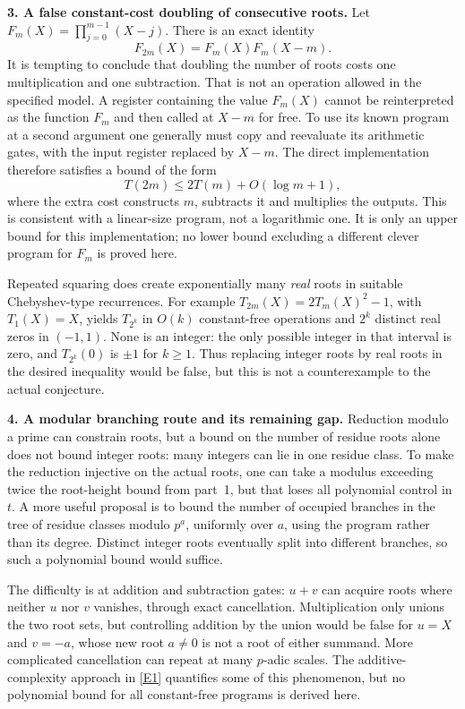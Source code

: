\documentclass[11pt,a4paper]{article}
\newcommand{\eref}[2]{\hyperlink{extra:#1:#2}{[E#2]}}
\numberwithin{equation}{section}
\begin{document}
\textbf{3. A false constant-cost doubling of consecutive roots.}
Let $F_m(X)=\prod_{j=0}^{m-1}(X-j)$. There is an exact identity
\begin{equation}\label{statement:falling}
 F_{2m}(X)=F_m(X)F_m(X-m).
\end{equation}
It is tempting to conclude that doubling the number of roots costs one
multiplication and one subtraction. That is not an operation allowed in
the specified model. A register containing the value $F_m(X)$ cannot be
reinterpreted as the function $F_m$ and then called at $X-m$ for free.
To use its known program at a second argument one generally must copy
and reevaluate its arithmetic gates, with the input register replaced by
$X-m$. The direct implementation therefore satisfies a bound of the form
\[
 T(2m)\le 2T(m)+O(\log m+1),
\]
where the extra cost constructs $m$, subtracts it and multiplies the
outputs. This is consistent with a linear-size program, not a logarithmic
one. It is only an upper bound for this implementation; no lower bound
excluding a different clever program for $F_m$ is proved here.

Repeated squaring does create exponentially many \emph{real} roots in
suitable Chebyshev-type recurrences. For example
$T_{2m}(X)=2T_m(X)^2-1$, with $T_1(X)=X$, yields $T_{2^k}$ in $O(k)$
constant-free operations and $2^k$ distinct real zeros in $(-1,1)$.
None is an integer: the only possible integer in that interval is zero,
and $T_{2^k}(0)$ is $\pm1$ for $k\ge1$. Thus replacing integer roots by
real roots in the desired inequality would be false, but this is not a
counterexample to the actual conjecture.

\textbf{4. A modular branching route and its remaining gap.}
Reduction modulo a prime can constrain roots, but a bound on the number
of residue roots alone does not bound integer roots: many integers can
lie in one residue class. To make the reduction injective on the actual
roots, one can take a modulus exceeding twice the root-height bound from
part~1, but that loses all polynomial control in $t$.
A more useful proposal is to bound the number of occupied branches in
the tree of residue classes modulo $p^a$, uniformly over $a$, using the
program rather than its degree. Distinct integer roots eventually split
into different branches, so such a polynomial bound would suffice.

The difficulty is at addition and subtraction gates: $u+v$ can acquire
roots where neither $u$ nor $v$ vanishes, through exact cancellation.
Multiplication only unions the two root sets, but controlling addition
by the union would be false for $u=X$ and $v=-a$, whose new root
$a\ne0$ is not a root
of either summand. More complicated cancellation can repeat at many
$p$-adic scales. The additive-complexity approach in \eref{statement}{1}
quantifies some of this phenomenon, but no polynomial bound for all
constant-free programs is derived here.
\end{document}
